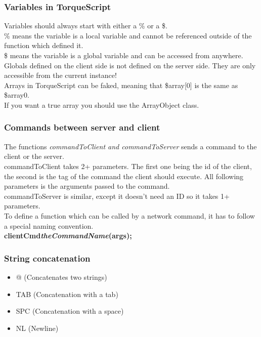 \begin{frame}
\hypertarget{QG-Variables}{}
\frametitle{Variables in TorqueScript}
Variables should always start with either a \% or a \$.\\
\% means the variable is a local variable and cannot be referenced outside of the function which defined it.\\
\$ means the variable is a global variable and can be accessed from anywhere.\\
Globals defined on the client side is not defined on the server side. They are only accessible from the current instance!\\
Arrays in TorqueScript can be faked, meaning that \$array[0] is the same as \$array0.\\
If you want a true array you should use the ArrayObject class.
\end{frame}

\begin{frame}
\hypertarget{QG-Networking}{}
\frametitle{Commands between server and client}
The functions {\it commandToClient and commandToServer} sends a command to the client or the server.\\
commandToClient takes 2+ parameters. The first one being the id of the client, the second is the tag
of the command the client should execute. All following parameters is the arguments passed to the command.\\
commandToServer is similar, except it doesn't need an ID so it takes 1+ parameters.\\
To define a function which can be called by a network command, it has to follow a special naming convention.\\
{\bf clientCmd{\it theCommandName}(args);}
\end{frame}

\begin{frame}
\hypertarget{QG-Concatenation}{}
\frametitle{String concatenation}
	\begin{itemize}
	\item @ (Concatenates two strings)
	\item TAB (Concatenation with a tab)
	\item SPC (Concatenation with a space)
	\item NL (Newline)
	\end{itemize}
\end{frame}

